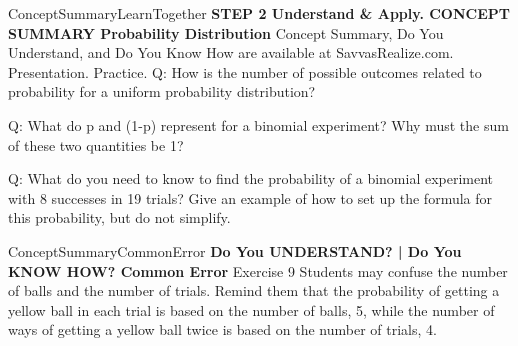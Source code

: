 \documentclass{article}
\newenvironment{te-addendum}[2]{}{}     %
\newcommand{\answer}[1]{}               %
\begin{document}
\begin{te-addendum}{ConceptSummary}{LearnTogether}
\textbf{STEP 2 Understand \& Apply. CONCEPT SUMMARY Probability Distribution}
Concept Summary, Do You Understand, and Do You Know How are available at SavvasRealize.com. Presentation. Practice.
Q: How is the number of possible outcomes related to probability for a uniform probability distribution?
\answer{For n possible outcomes, each outcome has a probability of (\frac1n) of occurring or (\frac{n-1}{n}) of not occurring.}
Q: What do p and (1-p) represent for a binomial experiment? Why must the sum of these two quantities be 1?
\answer{p is the probability of success in each trial, and (1-p) is the probability of failure, or not-success. Their sum is 1 because the sum of the probabilities of all possible outcomes of an experiment is 1.}
Q: What do you need to know to find the probability of a binomial experiment with 8 successes in 19 trials? Give an example of how to set up the formula for this probability, but do not simplify.
\answer{The probability of success, p; for example, if (p=0.9), the formula would be (P(8)={}_{19}C_8(0.9)^8(1-0.9)^{19-8}).}
\end{te-addendum}
\begin{te-addendum}{ConceptSummary}{CommonError}
\textbf{Do You UNDERSTAND? | Do You KNOW HOW? Common Error}
Exercise 9 Students may confuse the number of balls and the number of trials. Remind them that the probability of getting a yellow ball in each trial is based on the number of balls, 5, while the number of ways of getting a yellow ball twice is based on the number of trials, 4.
\end{te-addendum}
\end{document}
